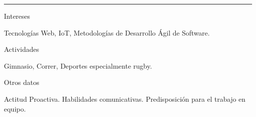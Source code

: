 \documentclass[a4paper,10pt]{article}
\newlength{\cvcolumngapwidth}
\newlength{\cvleftcolumnwidth}
\newlength{\cvrightcolumnwidth}
\newcommand{\cvsectionstyle}[1]{{\normalsize\cvsectionfont\textcolor{cvsectioncolor}{#1}}}
\newcommand{\cvheadingstyle}[1]{{\normalsize\cvheadingfont\textcolor{cvheadingcolor}{#1}}}
\newlength{\cvafteritemskipamount}
\newlength{\cvaftersectionskipamount}
\newlength{\cvbetweensectionandheadingextraskipamount}
\newlength{\cvparskip}
\newcommand{\cvsection}[1]{
    \begin{minipage}[t]{\cvleftcolumnwidth}
        \raggedleft\cvsectionstyle{#1}
    \end{minipage}%
    \hspace{\cvcolumngapwidth}%
    \begin{minipage}[t]{\cvrightcolumnwidth}
        \textcolor{cvrulecolor}{\rule{\cvrightcolumnwidth}{0.3mm}}
    \end{minipage}

    \vspace{\cvaftersectionskipamount}
}
\newcommand{\cvitem}[2]{
    \begin{minipage}[t]{\cvleftcolumnwidth}
        \raggedleft #1
    \end{minipage}%
    \hspace{\cvcolumngapwidth}%
    \begin{minipage}[t]{\cvrightcolumnwidth}
        \setlength{\parskip}{\cvparskip} #2
    \end{minipage}

    \vspace{\cvafteritemskipamount}
}
\begin{document}

\cvsection{INFORMACIÓN ADICIONAL}

\vspace{\cvbetweensectionandheadingextraskipamount}


\cvitem{
    \cvheadingstyle{Intereses}
}{
    Tecnologías Web, IoT, Metodologías de Desarrollo Ágil de Software.
}

\cvitem{
    \cvheadingstyle{Actividades}
}{
    Gimnasio, Correr, Deportes especialmente rugby.
}

\cvitem{
    \cvheadingstyle{Otros datos}
}{
    Actitud Proactiva. Habilidades comunicativas. Predisposición para el trabajo en equipo.
}
\end{document}
